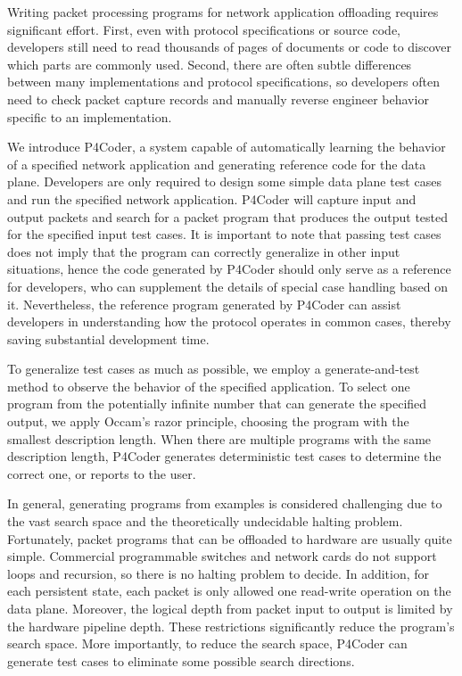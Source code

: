 Writing packet processing programs for network application offloading requires significant effort. First, even with protocol specifications or source code, developers still need to read thousands of pages of documents or code to discover which parts are commonly used. Second, there are often subtle differences between many implementations and protocol specifications, so developers often need to check packet capture records and manually reverse engineer behavior specific to an implementation.

We introduce P4Coder, a system capable of automatically learning the behavior of a specified network application and generating reference code for the data plane. Developers are only required to design some simple data plane test cases and run the specified network application. P4Coder will capture input and output packets and search for a packet program that produces the output tested for the specified input test cases. It is important to note that passing test cases does not imply that the program can correctly generalize in other input situations, hence the code generated by P4Coder should only serve as a reference for developers, who can supplement the details of special case handling based on it. Nevertheless, the reference program generated by P4Coder can assist developers in understanding how the protocol operates in common cases, thereby saving substantial development time.

To generalize test cases as much as possible, we employ a generate-and-test method to observe the behavior of the specified application. To select one program from the potentially infinite number that can generate the specified output, we apply Occam's razor principle, choosing the program with the smallest description length. When there are multiple programs with the same description length, P4Coder generates deterministic test cases to determine the correct one, or reports to the user.

In general, generating programs from examples is considered challenging due to the vast search space and the theoretically undecidable halting problem. Fortunately, packet programs that can be offloaded to hardware are usually quite simple. Commercial programmable switches and network cards do not support loops and recursion, so there is no halting problem to decide. In addition, for each persistent state, each packet is only allowed one read-write operation on the data plane. Moreover, the logical depth from packet input to output is limited by the hardware pipeline depth. These restrictions significantly reduce the program's search space. More importantly, to reduce the search space, P4Coder can generate test cases to eliminate some possible search directions.

